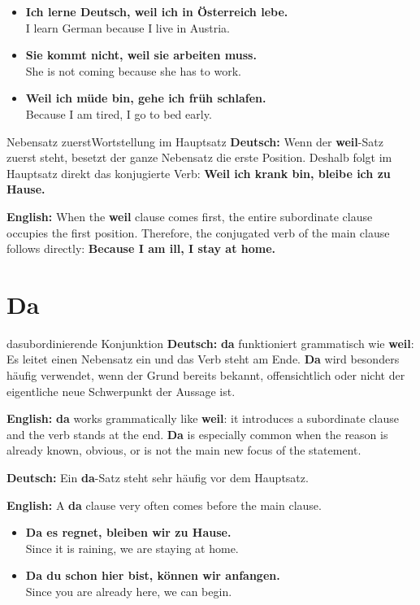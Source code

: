 \documentclass[a4paper,11pt]{article}
\newcommand{\GermanText}[1]{\textbf{Deutsch: }#1\par}
\newcommand{\EnglishText}[1]{{\small\color{SoftGray}\textbf{English: }#1\par}}
\newcommand{\ExampleItem}[2]{\item \textbf{#1}\\{\small\color{SoftGray}#2}}
\begin{document}
        \begin{exbox}
            \begin{itemize}
                \ExampleItem{Ich lerne Deutsch, weil ich in Österreich lebe.}{I learn German because I live in Austria.}
                \ExampleItem{Sie kommt nicht, weil sie arbeiten muss.}{She is not coming because she has to work.}
                \ExampleItem{Weil ich müde bin, gehe ich früh schlafen.}{Because I am tired, I go to bed early.}
            \end{itemize}
        \end{exbox}

        \begin{grammarentry}{Nebensatz zuerst}{Wortstellung im Hauptsatz}
            \GermanText{Wenn der \textbf{weil}-Satz zuerst steht, besetzt der ganze Nebensatz die erste Position. Deshalb folgt im Hauptsatz direkt das konjugierte Verb: \textbf{Weil ich krank bin, bleibe ich zu Hause.}}
            \EnglishText{When the \textbf{weil} clause comes first, the entire subordinate clause occupies the first position. Therefore, the conjugated verb of the main clause follows directly: \textbf{Because I am ill, I stay at home.}}
        \end{grammarentry}

    \section{Da}

        \begin{grammarentry}{da}{subordinierende Konjunktion}
            \GermanText{\textbf{da} funktioniert grammatisch wie \textbf{weil}: Es leitet einen Nebensatz ein und das Verb steht am Ende. \textbf{Da} wird besonders häufig verwendet, wenn der Grund bereits bekannt, offensichtlich oder nicht der eigentliche neue Schwerpunkt der Aussage ist.}
            \EnglishText{\textbf{da} works grammatically like \textbf{weil}: it introduces a subordinate clause and the verb stands at the end. \textbf{Da} is especially common when the reason is already known, obvious, or is not the main new focus of the statement.}

            \GermanText{Ein \textbf{da}-Satz steht sehr häufig vor dem Hauptsatz.}
            \EnglishText{A \textbf{da} clause very often comes before the main clause.}
        \end{grammarentry}

        \begin{exbox}
            \begin{itemize}
                \ExampleItem{Da es regnet, bleiben wir zu Hause.}{Since it is raining, we are staying at home.}
                \ExampleItem{Da du schon hier bist, können wir anfangen.}{Since you are already here, we can begin.}
            \end{itemize}
        \end{exbox}
\end{document}
